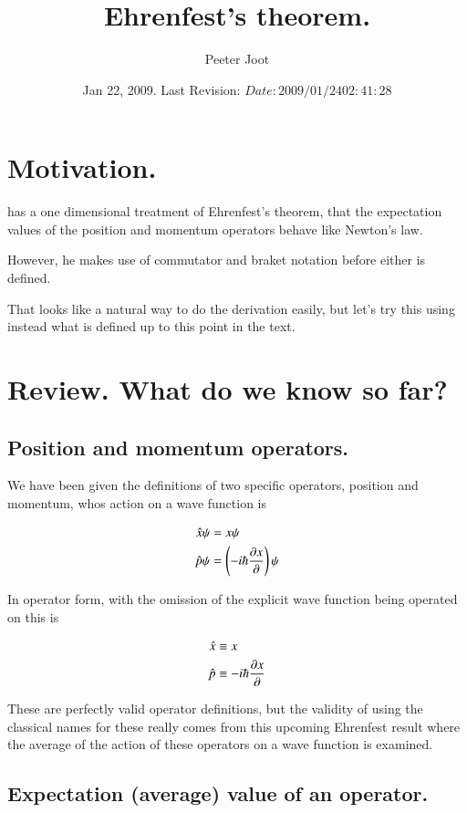 \documentclass{article}
\title{ Ehrenfest's theorem. }
\author{Peeter Joot}
\date{ Jan 22, 2009.  Last Revision: $Date: 2009/01/24 02:41:28 $ }
\begin{document}
\maketitle{}

\tableofcontents
\section{ Motivation. }

\cite{mcmahon2005qmd} has a one dimensional treatment of Ehrenfest's theorem,
that the expectation values of the position and momentum operators behave
like Newton's law.

However, he makes use
of commutator and braket notation before either is defined.

That looks like a natural way to do the derivation easily, but let's try
this using instead what is defined up to this point in the text.

\section{ Review.  What do we know so far? }

\subsection{ Position and momentum operators. }

We have been given the definitions of two specific operators, position and momentum, 
whos action on a wave function is

\begin{align*}
\hat{x} \psi &= x \psi \\
\hat{p} \psi &= \left(-i \hbar \frac{\partial{x}}{\partial {}}\right) \psi
\end{align*}

In operator form, with the omission of the explicit wave function being operated on this is

\begin{align*}
\hat{x} &\equiv x  \\
\hat{p} &\equiv -i \hbar \frac{\partial{x}}{\partial {}}
\end{align*}

These are perfectly valid operator definitions, but the validity of using the 
classical names for these really comes from this upcoming Ehrenfest result where
the average of the action of these operators on a wave function is examined.

\subsection{ Expectation (average) value of an operator. }
\end{document}
